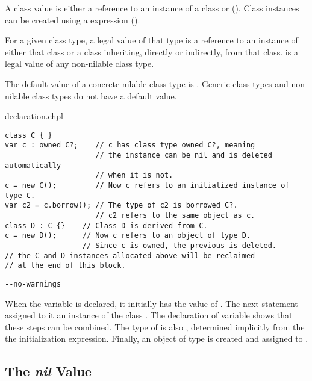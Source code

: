 A class value is either a reference to an instance of a class
or  (). Class instances can be created
using a  expression ().

For a given class type, a legal value of that type is a reference to
an instance of either that class or a class inheriting, directly or
indirectly, from that class.
 is a legal value of any non-nilable class type.

The default value of a concrete nilable class type is . Generic
class types and non-nilable class types do not have a default value.

\begin{chapelexample}{declaration.chpl}
\begin{chapel}
\begin{verbatim}
class C { }
var c : owned C?;    // c has class type owned C?, meaning
                     // the instance can be nil and is deleted automatically
                     // when it is not.
c = new C();         // Now c refers to an initialized instance of type C.
var c2 = c.borrow(); // The type of c2 is borrowed C?.
                     // c2 refers to the same object as c.
class D : C {}    // Class D is derived from C.
c = new D();      // Now c refers to an object of type D.
                  // Since c is owned, the previous is deleted.
// the C and D instances allocated above will be reclaimed
// at the end of this block.
\end{verbatim}
\end{chapel}
\begin{chapelcompopts}
\begin{verbatim}
--no-warnings
\end{verbatim}
\end{chapelcompopts}
When the variable  is declared, it initially has the value of
.  The next statement assigned to it an instance of the class
.  The declaration of variable  shows that these steps
can be combined.  The type of  is also , determined
implicitly from the the initialization expression.  Finally, an object
of type  is created and assigned to .
\end{chapelexample}

\subsection{The {\em nil} Value}
\label{Class_nil_value}

